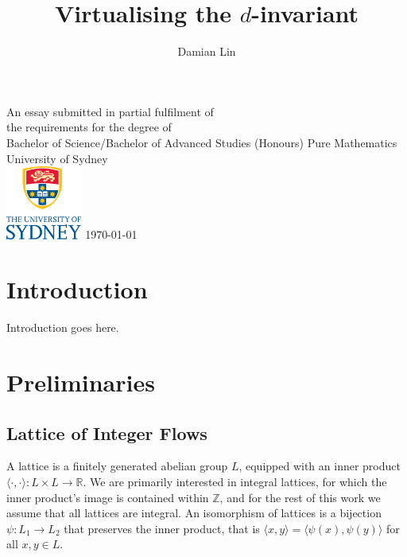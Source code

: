 \documentclass[12pt]{report}
\newcommand{\R}{\mathbb{R}}
\newcommand{\Z}{\mathbb{Z}}
\newcommand{\ip}[2]{\langle #1, #2 \rangle}
\begin{document}
	

\author{Damian Lin}
\title{Virtualising the $d$-invariant}

\cleardoublepage \thispagestyle{empty}
\null \vfil
\begingroup
\LARGE \bfseries \centering
\openup \medskipamount
\thetitle \par \vspace{30pt}
\centering \mdseries \theauthor \par \bigskip
\endgroup
\vfil \vfil \vfil
\begin{center}
	An essay submitted in partial fulfilment of\\
	the requirements for the degree of\\
	Bachelor of Science/Bachelor of Advanced Studies (Honours)
	\vfil\vfil
	{\large Pure Mathematics\\[5pt]
		University of Sydney}\\
	\vskip6mm
	\includegraphics[width=25mm]{graphics/USY_MB1_CMYK_Stacked_Logo}
	\vfil
	\normalsize\today
\end{center}
\vfil
\cleardoublepage

\tableofcontents


\chapter{Introduction}

Introduction goes here.

\chapter{Preliminaries}

\section{Lattice of Integer Flows}
A lattice is a finitely generated abelian group $L$, equipped with an inner product 
\(\ip{\cdot}{\cdot}: L \times L \longrightarrow \R\). We are primarily interested in integral lattices, for which the inner product's image is contained within $\Z$, and for the rest of this work we assume that all lattices are integral. An isomorphism of lattices is a bijection $\psi: L_{1} \longrightarrow L_{2}$ that preserves the inner product, that is $\ip{x}{y} = \ip{\psi(x)}{\psi(y)}$ for all $x, y \in L$.
\end{document}
